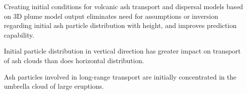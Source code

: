 \documentclass[draft,linenumbers]{agujournal2019}
\begin{document}




\begin{keypoints}
 \item Creating initial conditions for volcanic ash transport and dispersal models based on 3D plume model output eliminates need for assumptions or inversion regarding initial ash particle distribution with height, and improves prediction capability.
\item Initial particle distribution in vertical direction has greater impact on transport of ash clouds than does horizontal distribution.
\item Ash particles involved in long-range transport are initially concentrated in the umbrella cloud of large eruptions.
\end{keypoints}

%
%

\end{document}
